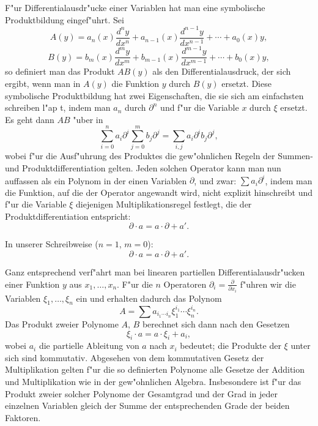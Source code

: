 \documentclass[12pt,a4paper]{article}
\begin{document}
F"ur Differentialausdr"ucke einer Variablen hat man eine symbolische Produktbildung eingef"uhrt. Sei
\[
A(y) = a_n(x) \frac{d^n y}{dx^n} + a_{n-1}(x) \frac{d^{n-1}y}{dx^{n-1}} + \cdots + a_0(x) y,
\]
\[
B(y) = b_m(x) \frac{d^m y}{dx^m} + b_{m-1}(x) \frac{d^{m-1}y}{dx^{m-1}} + \cdots + b_0(x) y,
\]
so definiert man das Produkt $AB(y)$ als den Differentialausdruck, der sich ergibt, wenn man in $A(y)$ die Funktion $y$ durch $B(y)$ ersetzt. Diese symbolische Produktbildung hat zwei Eigenschaften, die sie sich am einfachsten schreiben l"ap t, indem man $a_n$ durch $\partial^n$ und f"ur die Variable $x$ durch $\xi$ ersetzt. Es geht dann $AB$ "uber in
\[
\sum_{i=0}^{n} a_i \partial^i \sum_{j=0}^{m} b_j \partial^j = \sum_{i,j} a_i \partial^i b_j \partial^j,
\]
wobei f"ur die Ausf"uhrung des Produktes die gew"ohnlichen Regeln der Summen- und Produktdifferentiation gelten. Jeden solchen Operator kann man nun auffassen als ein Polynom in der einen Variablen $\partial$, und zwar: $\sum a_i \partial^i$, indem man die Funktion, auf die der Operator angewandt wird, nicht explizit hinschreibt und f"ur die Variable $\xi$ diejenigen Multiplikationsregel festlegt, die der Produktdifferentiation entspricht:
\begin{equation}
\partial \cdot a = a \cdot \partial + a'.
\end{equation}

In unserer Schreibweise ($n=1$, $m=0$):
\begin{equation}
\partial \cdot a = a \cdot \partial + a'.
\end{equation}

Ganz entsprechend verf"ahrt man bei linearen partiellen Differentialausdr"ucken einer Funktion $y$ aus $x_1,\ldots,x_n$. F"ur die $n$ Operatoren $\partial_i = \frac{\partial}{\partial x_i}$ f"uhren wir die Variablen $\xi_1,\ldots,\xi_n$ ein und erhalten dadurch das Polynom
\[
A = \sum a_{i_1 \cdots i_n} \xi_1^{i_1} \cdots \xi_n^{i_n}.
\]
Das Produkt zweier Polynome $A$, $B$ berechnet sich dann nach den Gesetzen
\begin{equation}
\xi_i \cdot a = a \cdot \xi_i + a_i, \tag{2}
\end{equation}
wobei $a_i$ die partielle Ableitung von $a$ nach $x_i$ bedeutet; die Produkte der $\xi$ unter sich sind kommutativ. Abgesehen von dem kommutativen Gesetz der Multiplikation gelten f"ur die so definierten Polynome alle Gesetze der Addition und Multiplikation wie in der gew"ohnlichen Algebra. Insbesondere ist f"ur das Produkt zweier solcher Polynome der Gesamtgrad und der Grad in jeder einzelnen Variablen gleich der Summe der entsprechenden Grade der beiden Faktoren.
\end{document}
